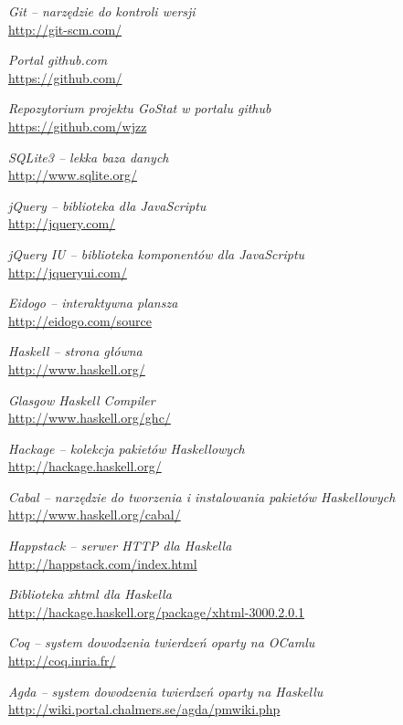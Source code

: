 \documentclass[10pt,leqno]{article}
\begin{document}
\begin{thebibliography}{9}

  \emph{Git -- narzędzie do kontroli wersji} \\
  \url{http://git-scm.com/}

  \emph{Portal github.com} \\
  \url{https://github.com/}

  \emph{Repozytorium projektu GoStat w portalu github} \\
  \url{https://github.com/wjzz}

  \emph{SQLite3 -- lekka baza danych} \\
  \url{http://www.sqlite.org/}

  \emph{jQuery -- biblioteka dla JavaScriptu} \\
  \url{http://jquery.com/}

  \emph{jQuery IU -- biblioteka komponentów dla JavaScriptu} \\
  \url{http://jqueryui.com/}

  \emph{Eidogo -- interaktywna plansza} \\
  \url{http://eidogo.com/source}

  \emph{Haskell -- strona główna} \\
  \url{http://www.haskell.org/}

  \emph{Glasgow Haskell Compiler} \\
  \url{http://www.haskell.org/ghc/}

  \emph{Hackage -- kolekcja pakietów Haskellowych} \\
  \url{http://hackage.haskell.org/}

  \emph{Cabal -- narzędzie do tworzenia i instalowania pakietów Haskellowych} \\
  \url{http://www.haskell.org/cabal/}

  \emph{Happstack -- serwer HTTP dla Haskella} \\
  \url{http://happstack.com/index.html}

  \emph{Biblioteka xhtml dla Haskella} \\
  \url{http://hackage.haskell.org/package/xhtml-3000.2.0.1}

  \emph{Coq -- system dowodzenia twierdzeń oparty na OCamlu} \\
  \url{http://coq.inria.fr/}

  \emph{Agda -- system dowodzenia twierdzeń oparty na Haskellu} \\
  \url{http://wiki.portal.chalmers.se/agda/pmwiki.php}

\end{thebibliography}
\end{document}
